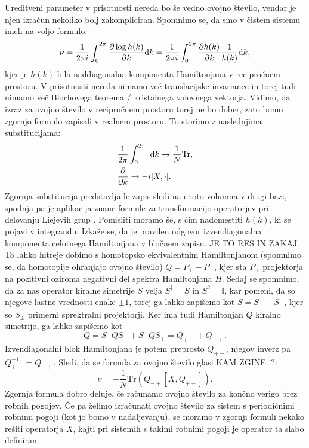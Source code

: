Ureditveni parameter v prisotnosti nereda bo še vedno ovojno število, vendar je njen izračun nekoliko bolj zakompliciran.
Spomnimo se, da smo v čistem sistemu imeli na voljo formulo:
\begin{equation}
\nu = \frac{1}{2 \pi i} \int_0^{2 \pi} \frac{\partial \log h(k)}{\partial k} \textup{d}k = \frac{1}{2 \pi i} \int_0^{2 \pi} \frac{\partial h(k)}{\partial k} \frac{1}{h(k)} \textup{d}k,
\end{equation}
kjer je $h(k)$ bila naddiagonalna komponenta Hamiltonjana v recipročnem prostoru. V prisotnosti nereda nimamo več translacijske invariance in torej tudi nimamo več Blochovega teorema / kristalnega valovnega vektorja. Vidimo, da izraz za ovojno število v recipročnem prostoru torej ne bo dober, zato bomo zgornjo formulo zapisali v realnem prostoru.
To storimo z naslednjima substitucijama:
\begin{align}
&\frac{1}{2 \pi} \int_0^{2 \pi}\  \textup{d}k \to \frac{1}{N} \mathrm{Tr}, \\
&\frac{\partial}{\partial k} \to  -i [X, \cdot ]. 
\end{align}
Zgornja substitucija predstavlja le zapis sledi na enoto volumna v drugi bazi, spodnja pa je aplikacija znane formule za transformacijo operatorjev pri delovanju Liejevih grup \cite{georgi}.
Pomisliti moramo še, s čim nadomestiti $h(k)$, ki se pojavi v integrandu. Izkaže se, da je pravilen odgovor izvendiagonalna komponenta celotnega Hamiltonjana v bločnem zapisu. JE TO RES IN ZAKAJ To lahko hitreje dobimo s homotopsko ekvivalentnim Hamiltonjanom (spomnimo se, da homotopije ohranjajo ovojno število) $Q=P_+ - P_-$, kjer sta $P_\pm$ projektorja na pozitivni oziroma negativni del spektra Hamiltonjana $H$. Sedaj se spomnimo, da za nas operator kiralne simetrije $S$ velja $S^\dagger =S $ in $S^2 = \mathbb{I}$, kar pomeni, da so njegove lastne vrednosti enake $\pm 1$, torej ga lahko zapišemo kot $S = S_+ - S_-$, kjer so $S_\pm$ primerni sprektralni projektorji. Ker ima tudi Hamiltonjan $Q$ kiralno simetrijo, ga lahko zapišemo kot
\begin{equation}
Q = S_+ Q S_- + S_- Q S_+ = Q_{+-} + Q_{-+}.
\end{equation} 
Izvendiagonalni blok Hamiltonjana je potem preprosto $Q_{+-}$, njegov inverz pa $Q_{+-}^{-1} = Q_{-+}$.
Sledi, da se formula za ovojno število glasi KAM ZGINE i?:
\begin{equation}
\nu = -\frac{1}{N} \mathrm{Tr} \left(Q_{-+} [X,Q_{+-}] \right).
\end{equation}
Zgornja formula dobro deluje, če računamo ovojno število za končno verigo brez robnih pogojev. Če pa želimo izračunati ovojno število za sistem s periodičnimi robnimi pogoji (kot jo bomo v nadaljevanju), se moramo v zgornji formuli nekako rešiti operatorja $X$, kajti  pri sistemih s takimi robnimi pogoji je operator ta slabo definiran.
